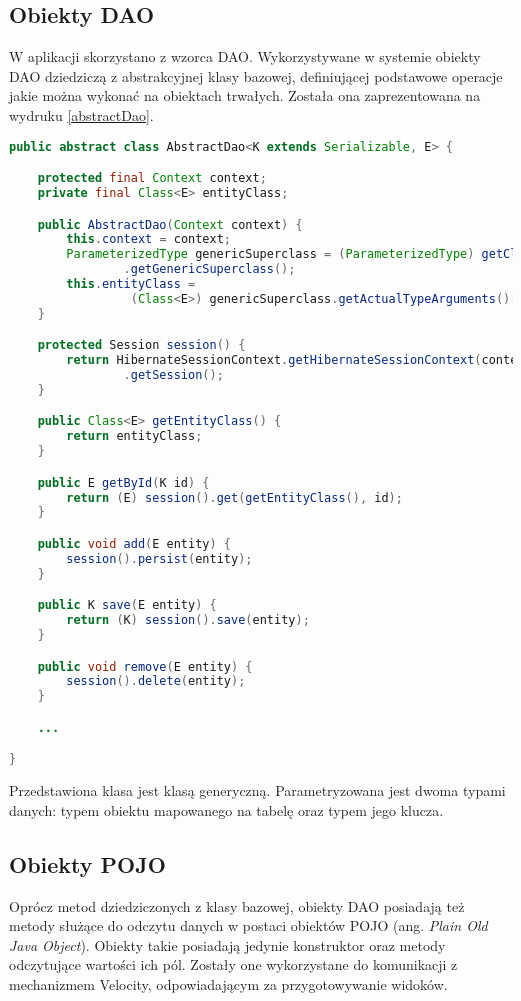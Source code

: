  


\subsection[Obiekty DAO][Obiekty DAO]{Obiekty DAO}
W aplikacji skorzystano z wzorca DAO. Wykorzystywane w systemie obiekty DAO dziedziczą z abstrakcyjnej klasy bazowej, definiującej podstawowe operacje jakie można wykonać na obiektach trwałych. Została ona zaprezentowana na wydruku \ref{abstractDao}.

\begin{lstlisting}[language=Java,style=outcode,showstringspaces=false,caption=Bazowa klasa DAO,label={abstractDao}]
public abstract class AbstractDao<K extends Serializable, E> {

	protected final Context context;
	private final Class<E> entityClass;

	public AbstractDao(Context context) {
		this.context = context;
		ParameterizedType genericSuperclass = (ParameterizedType) getClass()
				.getGenericSuperclass();
		this.entityClass = 
				 (Class<E>) genericSuperclass.getActualTypeArguments()[1];
	}

	protected Session session() {
		return HibernateSessionContext.getHibernateSessionContext(context)
				.getSession();
	}

	public Class<E> getEntityClass() {
		return entityClass;
	}

	public E getById(K id) {
		return (E) session().get(getEntityClass(), id);
	}

	public void add(E entity) {
		session().persist(entity);
	}

	public K save(E entity) {
		return (K) session().save(entity);
	}

	public void remove(E entity) {
		session().delete(entity);
	}

	...

}
\end{lstlisting}

Przedstawiona klasa jest klasą generyczną. Parametryzowana jest dwoma typami danych: typem obiektu mapowanego na tabelę oraz typem jego klucza. 

\subsection[Obiekty POJO][Obiekty POJO]{Obiekty POJO}
Oprócz metod dziedziczonych z klasy bazowej, obiekty DAO posiadają też metody służące do odczytu danych w postaci obiektów POJO (ang. \textit{Plain Old Java Object}).
Obiekty takie posiadają jedynie konstruktor oraz metody odczytujące wartości ich pól. Zostały one wykorzystane do komunikacji z mechanizmem Velocity, odpowiadającym za przygotowywanie widoków.

